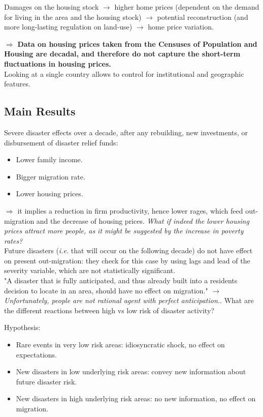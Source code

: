 \documentclass[11pt, oneside]{article}   	%
\begin{document}
{Damages on the housing stock} $\to$ higher home prices (dependent on the demand for living in the area and the housing stock) $\to$ potential reconstruction (and more long-lasting regulation on land-use) $\to$ home price variation.

$\Longrightarrow$ \textbf{Data on housing prices taken from the Censuses of Population and Housing are decadal, and therefore do not capture the short-term fluctuations in housing prices.} \\

Looking at a single country allows to control for institutional and geographic features. 

\subsection{Main Results}
Severe disaster effects over a decade, after any rebuilding, new investments, or disbursement of disaster relief funds:
\begin{itemize}
    \item Lower family income.
    \item Bigger migration rate.
    \item Lower housing prices.
\end{itemize}
$\Longrightarrow$ it implies a reduction in firm productivity, hence lower rages, which feed out-migration and the decrease of housing prices. \textit{What if indeed the lower housing prices attract more people, as it might be suggested by the increase in poverty rates?} \\

Future disasters (\textit{i.e.} that will occur on the following decade) do not have effect on present out-migration: they check for this case by using lags and lead of the severity variable, which are not statistically significant. \\

"A disaster that is fully anticipated, and thus already built into a residents decision to locate in an area, should have no effect on migration." $\to$ \textit{Unfortunately, people are not rational agent with perfect anticipation.}. What are the different reactions between high vs low risk of disaster activity?

Hypothesis:
\begin{itemize}
    \item Rare events in very low risk areas: idiosyncratic shock, no effect on expectations.   
    \item New disasters in low underlying risk areas: convey new information about future disaster risk.
    \item New disasters in high underlying risk areas: no new information, no effect on migration.
\end{itemize}
\end{document}
